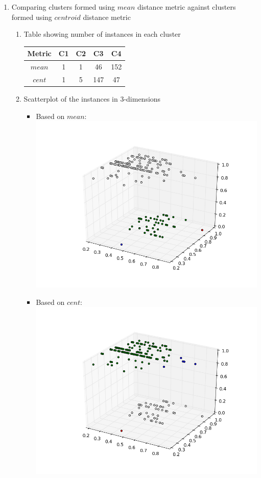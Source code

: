 \documentclass[11pt]{article}
\begin{document}
\begin{enumerate}[a.]
\begin{enumerate}
\item Comparing clusters formed using $mean$ distance metric against clusters formed using $centroid$ distance metric
\begin{enumerate}
\item Table showing number of instances in each cluster\\
\begin{tabular}{|c|c|c|c|c|}
\hline
Metric & C1 & C2 & C3 & C4\\ \hline
$mean$ & 1 & 1 & 46 & 152\\ \hline
$cent$ & 1 & 5 & 147 & 47\\
\hline
\end{tabular}
\item Scatterplot of the instances in 3-dimensions
\begin{itemize}
	\item Based on $mean$:\\
	\includegraphics[width=120mm]{graphhacmean.png}
	\item Based on $cent$:\\
	\includegraphics[width=120mm]{graphhaccent.png}

\end{itemize}
\end{enumerate}
\end{enumerate}
\end{enumerate}
\end{document}
